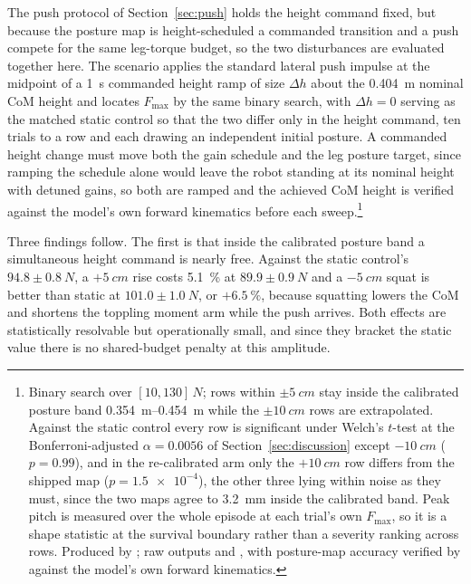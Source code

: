 \documentclass[a4paper,fleqn]{cas-dc}
\begin{document}
The push protocol of Section~\ref{sec:push} holds the height command fixed, but
because the posture map is height-scheduled a commanded transition and a push
compete for the same leg-torque budget, so the two disturbances are evaluated
together here. The scenario applies the standard lateral push impulse at the
midpoint of a \SI{1}{s} commanded height ramp of size $\Delta h$ about the
\SI{0.404}{m} nominal CoM height and locates $F_{\max}$ by the same binary
search, with $\Delta h{=}0$ serving as the matched static control so that the two
differ only in the height command, ten trials to a row and each drawing an
independent initial posture. A commanded height change must move both the gain
schedule and the leg posture target, since ramping the schedule alone would leave
the robot standing at its nominal height with detuned gains, so both are ramped
and the achieved CoM height is verified against the model's own forward
kinematics before each sweep.\footnote{Binary search over
$[10,130]\,\si{N}$; rows within $\pm\SI{5}{cm}$ stay inside the calibrated
posture band \SIrange{0.354}{0.454}{m} while the $\pm\SI{10}{cm}$ rows are
extrapolated. Against the static control every row is significant under Welch's
$t$-test at the Bonferroni-adjusted $\alpha{=}0.0056$ of
Section~\ref{sec:discussion} except $-\SI{10}{cm}$ ($p{=}0.99$), and in the
re-calibrated arm only the $+\SI{10}{cm}$ row differs from the shipped map
($p{=}\num{1.5e-4}$), the other three lying within noise as they must, since the
two maps agree to \SI{3.2}{mm} inside the calibrated band. Peak pitch is measured
over the whole episode at each trial's own $F_{\max}$, so it is a shape statistic
at the survival boundary rather than a severity ranking across rows. Produced by
; raw outputs
 and
, with posture-map accuracy verified by
 against the model's own forward kinematics.}

Three findings follow. The first is that inside the calibrated posture band a
simultaneous height command is nearly free. Against the static control's
$94.8{\pm}\SI{0.8}{N}$, a ${+}\SI{5}{cm}$ rise costs \SI{5.1}{\percent} at
$89.9{\pm}\SI{0.9}{N}$ and a ${-}\SI{5}{cm}$ squat is better than static at
$101.0{\pm}\SI{1.0}{N}$, or $+\SI{6.5}{\percent}$, because squatting lowers the
CoM and shortens the toppling moment arm while the push arrives. Both effects are
statistically resolvable but operationally small, and since they bracket the
static value there is no shared-budget penalty at this amplitude.
\end{document}
